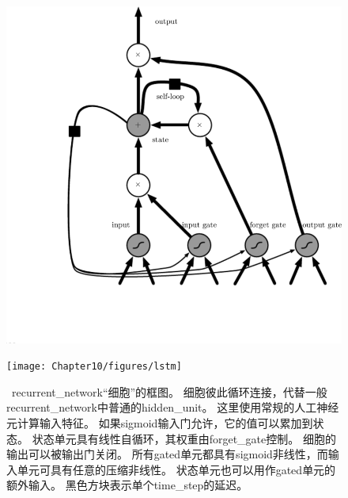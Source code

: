 \begin{figure}[!htb]
\ifOpenSource
\centerline{\includegraphics[scale=0.5]{images/104.png}}
\else
\centerline{\texttt{[image: Chapter10/figures/lstm]}}
\fi
\caption{~\gls{recurrent_network}``细胞''的框图。
细胞彼此循环连接，代替一般\gls{recurrent_network}中普通的\gls{hidden_unit}。
这里使用常规的人工神经元计算输入特征。
如果sigmoid输入门允许，它的值可以累加到状态。
状态单元具有线性自循环，其权重由\gls{forget_gate}控制。
细胞的输出可以被输出门关闭。
所有\gls{gated}单元都具有sigmoid非线性，而输入单元可具有任意的压缩非线性。
状态单元也可以用作\gls{gated}单元的额外输入。
黑色方块表示单个\gls{time_step}的延迟。
}
\label{fig:chap10_lstm}
\end{figure}

